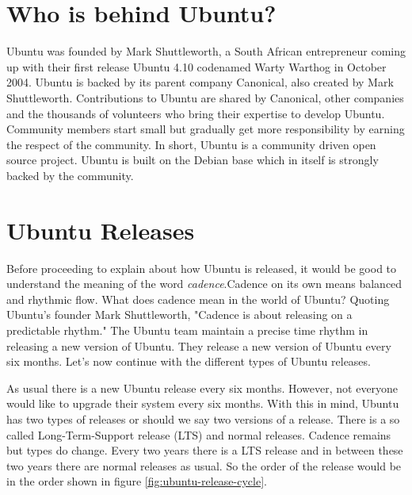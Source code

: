 \section{Who is behind Ubuntu?} \label{chap:about_ubuntu_who} 
Ubuntu was founded by Mark Shuttleworth, a South African entrepreneur coming up with their first release Ubuntu 4.10 codenamed Warty Warthog in October 2004. Ubuntu is backed by its parent company Canonical, also created by Mark Shuttleworth. Contributions to Ubuntu are shared by Canonical, other companies and the thousands of volunteers who bring their expertise to develop Ubuntu. Community members start small but gradually get more responsibility by earning the respect of the community. In short, Ubuntu is a community driven open source project. Ubuntu is built on the Debian base which in itself is strongly backed by the community.


\section{Ubuntu Releases} \label{chap:about_ubuntu_release} 
Before proceeding to explain about how Ubuntu is released, it would be good to understand the meaning of the word \emph{cadence}.Cadence on its own means balanced and rhythmic flow. What does cadence mean in the world of Ubuntu? Quoting Ubuntu's founder Mark Shuttleworth, "Cadence is about releasing on a predictable rhythm." The Ubuntu team maintain a precise time rhythm in releasing a new version of Ubuntu. They release a new version of Ubuntu every six months. Let's now continue with the different types of Ubuntu releases.\\

\par \noindent As usual there is a new Ubuntu release every six months. However, not everyone would like to upgrade their system every six months. With this in mind, Ubuntu has two types of releases or should we say two versions of a release. There is a so called Long-Term-Support release (LTS) and normal releases. Cadence remains but types do change. Every two years there is a LTS release and in between these two years there are normal releases as usual. So the order of the release would be in the order shown in figure \ref{fig:ubuntu-release-cycle}. \\

